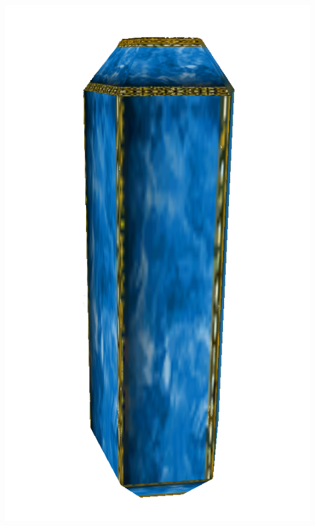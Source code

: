 \documentclass[11pt,polish, openany]{book}
\begin{document}
\newline
\begin{center}
	\includegraphics[scale=0.2]{kognisk}
\end{center}
\end{document}

